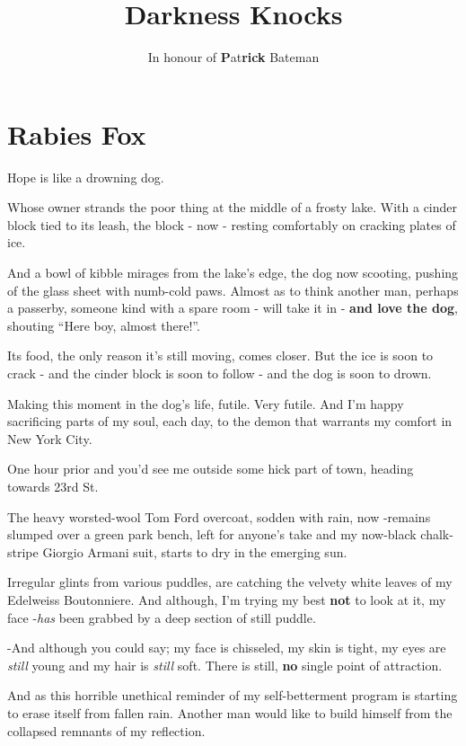 \documentclass[19pt,openany]{book}
\title{\textbf{D}ar\textbf{k}ness \textbf{K}noc\textbf{k}s}
\author{In honour of \textbf{P}at\textbf{rick} Bateman}
\date{}
\begin{document}
\maketitle
\tableofcontents

\chapter{Rabies Fox}
Hope is like a drowning dog.

Whose owner strands the
poor thing at the middle
of a frosty lake. With
a cinder block tied to its
leash, the block - now - resting
comfortably on cracking plates of ice.

And a bowl of kibble mirages
from the lake's edge, the dog now
scooting, pushing of the glass
sheet with numb-cold paws. Almost
as to think another man,
perhaps a passerby, someone kind
with a spare room - will take
it in - \textbf{and love the dog}, shouting
``Here boy, almost there!''.

Its food, the only reason
it's still moving, comes closer.
But the ice is soon to crack -
and the cinder block is soon
to follow - and the dog is
soon to drown.

Making this moment in the
dog's life, futile. Very futile.
And I'm happy sacrificing parts
of my soul, each day, to the demon
that warrants my comfort in New
York City.

One hour prior and you'd
see me outside some hick part
of town, heading towards 23rd
St.

The heavy worsted-wool Tom Ford
overcoat, sodden with rain,
now -remains slumped over a green
park bench, left for anyone's
take and my now-black chalk-stripe
Giorgio Armani suit, starts
to dry in the emerging sun.

Irregular glints from
various puddles, are catching
the velvety white
leaves of my Edelweiss
Boutonniere. And
although, I'm trying my best
\textbf{not} to look at it, my
face -\textit{has} been grabbed by
a deep section of still puddle.

-And although you could
say; my face is chisseled,
my skin is tight, my eyes
are \textit{still} young and
my hair is \textit{still} soft.
There is still, \textbf{no}
single point of attraction.

And as this horrible
unethical reminder of
my self-betterment program
is starting to erase itself
from fallen rain. Another
man would like to build himself
from the collapsed remnants
of my reflection.
\end{document}
